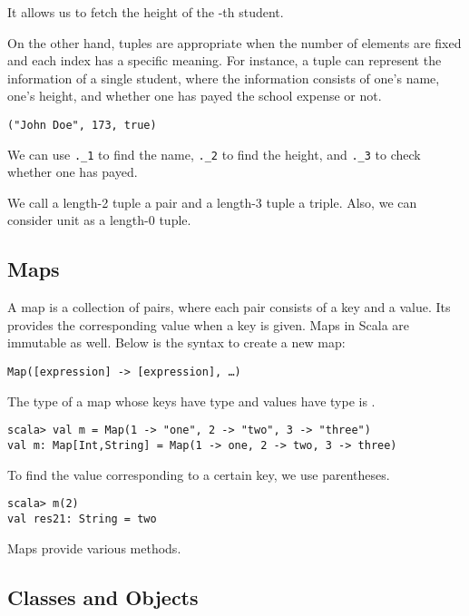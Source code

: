 It allows us to fetch the height of the -th student.

On the other hand, tuples are appropriate when the number of elements
are fixed and each index has a specific meaning. For instance,
a tuple can represent the information of a single student, where the information
consists of one's name, one's height, and whether one has payed the school
expense or not.

\begin{verbatim}
("John Doe", 173, true)
\end{verbatim}

We can use \verb+._1+ to find the name, \verb+._2+ to find the height, and
\verb+._3+ to check whether one has payed.

We call a length-2 tuple a pair and a length-3 tuple a triple. Also, we can
consider unit as a length-0 tuple.

\subsection{Maps}

A map is a collection of pairs, where each pair consists of a key and a value.
Its provides the corresponding value when a key is given.
Maps in Scala are immutable as well. Below is the syntax to create a new map:

\begin{verbatim}
Map([expression] -> [expression], …)
\end{verbatim}

The type of a map whose keys have type  and values have type  is
.

\begin{verbatim}
scala> val m = Map(1 -> "one", 2 -> "two", 3 -> "three")
val m: Map[Int,String] = Map(1 -> one, 2 -> two, 3 -> three)
\end{verbatim}

To find the value corresponding to a certain key, we use parentheses.

\begin{verbatim}
scala> m(2)
val res21: String = two
\end{verbatim}

Maps provide various
methods.

\subsection{Classes and Objects}

